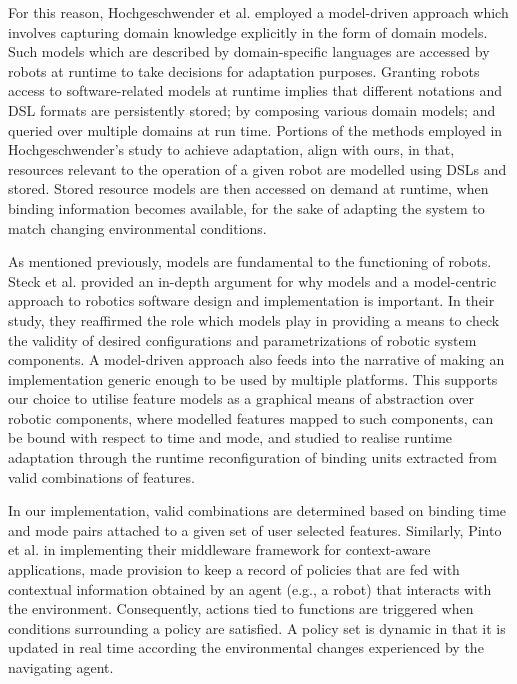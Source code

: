 \documentclass[conference]{IEEEtran}
\begin{document}
For this reason, Hochgeschwender et al. \cite{graph-mde} employed a model-driven approach which involves capturing domain knowledge explicitly in the form of domain models. Such models which are described by domain-specific languages are accessed by robots at runtime to take decisions for adaptation purposes. Granting robots access to software-related models at runtime implies that different notations and DSL formats are persistently stored; by composing various domain models; and queried over multiple domains at run time. Portions of the methods employed in Hochgeschwender's study to achieve adaptation, align with ours, in that, resources relevant to the operation of a given robot are modelled using DSLs and stored. Stored resource models are then accessed on demand at runtime, when binding information becomes available, for the sake of adapting the system to match changing environmental conditions.

As mentioned previously, models are fundamental to the functioning of robots. Steck et al. \cite{model-centric} provided an in-depth argument for why models and a model-centric approach to robotics software design and implementation is important.
In their study, they reaffirmed the role which models play in providing a means to check the validity of desired configurations and parametrizations of robotic system components. A model-driven approach also feeds into the narrative of making an implementation generic enough to be used by multiple platforms. This supports our choice to utilise feature models as a graphical means of abstraction over robotic components, where modelled features mapped to such components, can be bound with respect to time and mode, and studied to realise runtime adaptation through the runtime reconfiguration of binding units extracted from valid combinations of features.

In our implementation, valid combinations are determined based on binding time and mode pairs attached to a given set of user selected features. Similarly, Pinto et al. \cite{cont-aware} in implementing their middleware framework for context-aware applications, made provision to keep a record of policies that are fed with contextual information obtained by an agent (e.g., a robot) that interacts with the environment. Consequently, actions tied to functions are triggered when conditions surrounding a policy are satisfied. A policy set is dynamic in that it is updated in real time according the environmental changes experienced by the navigating agent.
 
\end{document}
